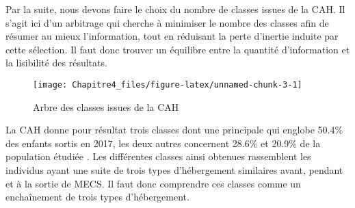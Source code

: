 \documentclass[
  12,
  a4paper,
]{report}
\begin{document}
Par la suite, nous devons faire le choix du nombre de classes issues de
la CAH. Il s'agit ici d'un arbitrage qui cherche à minimiser le nombre
des classes afin de résumer au mieux l'information, tout en réduisant la
perte d'inertie induite par cette sélection. Il faut donc trouver un
équilibre entre la quantité d'information et la lisibilité des
résultats.

\begin{figure}

{\centering \texttt{[image: Chapitre4\_files/figure-latex/unnamed-chunk-3-1]} 

}

\caption{Arbre des classes issues de la CAH}\label{fig:unnamed-chunk-3}
\end{figure}


La CAH donne pour résultat trois classes dont une principale qui englobe
50.4\% des enfants sortis en 2017, les deux autres concernent 28.6\% et
20.9\% de la population étudiée
.
Les différentes classes ainsi obtenues rassemblent les individus ayant
une suite de trois types d'hébergement similaires avant, pendant et à la
sortie de MECS. Il faut donc comprendre ces classes comme un
enchaînement de trois types d'hébergement.
\end{document}
